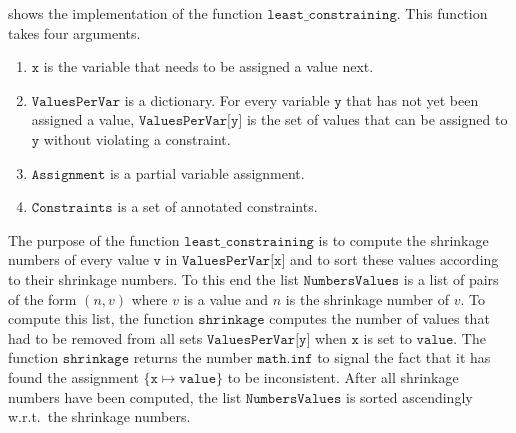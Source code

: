  shows the implementation of the function 
$\texttt{least\_constraining}$.  This function takes four arguments.
\begin{enumerate}
\item $\texttt{x}$ is the variable that needs to be assigned a value next.
\item $\texttt{ValuesPerVar}$ is a dictionary.  For every variable $\texttt{y}$ that has not yet been assigned
      a value, $\texttt{ValuesPerVar[y]}$ is the set of values that can be assigned to $\texttt{y}$ without
      violating a constraint.
\item $\texttt{Assignment}$ is a partial variable assignment.
\item $\texttt{Constraints}$ is a set of annotated constraints.
\end{enumerate}
The purpose of the function $\texttt{least\_constraining}$ is to compute the shrinkage numbers of every value
$\texttt{v}$ in $\texttt{ValuesPerVar[x]}$ and to sort these values according to their shrinkage numbers.
To this end the list $\texttt{NumbersValues}$ is a list of pairs of the form $(n, v)$ where $v$ is a value and
$n$ is the shrinkage number of $v$.  To compute this list, the function $\texttt{shrinkage}$ computes the
number of values that had to be removed from all sets $\texttt{ValuesPerVar[y]}$ when $\texttt{x}$ is set to 
$\texttt{value}$.  The function $\texttt{shrinkage}$ returns the number $\texttt{math.inf}$ to signal the fact
that it has found the assignment $\{ \texttt{x} \mapsto \texttt{value} \}$ to be inconsistent.
After all shrinkage numbers have been computed, the list $\texttt{NumbersValues}$ is sorted ascendingly
w.r.t.~the shrinkage numbers.

